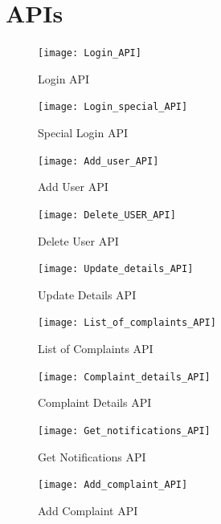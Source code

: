 \documentclass{article}
\begin{document}
\section{APIs}
        \begin{figure}[h]
            \centering
            \texttt{[image: Login\_API]}
            \caption{Login API}
            \label{fig:my_label}
        \end{figure}
        \begin{figure}[h]
            \centering
            \texttt{[image: Login\_special\_API]}
            \caption{Special Login API}
            \label{fig:my_label}
        \end{figure}
        \begin{figure}[h]
            \centering
            \texttt{[image: Add\_user\_API]}
            \caption{Add User API}
            \label{fig:my_label}
        \end{figure}
        \begin{figure}[h]
            \centering
            \texttt{[image: Delete\_USER\_API]}
            \caption{Delete User API}
            \label{fig:my_label}
        \end{figure}
        \begin{figure}[h]
            \centering
            \texttt{[image: Update\_details\_API]}
            \caption{Update Details API}
            \label{fig:my_label}
        \end{figure}
        \begin{figure}[h]
            \centering
            \texttt{[image: List\_of\_complaints\_API]}
            \caption{List of Complaints API}
            \label{fig:my_label}
        \end{figure}
        \begin{figure}[h]
            \centering
            \texttt{[image: Complaint\_details\_API]}
            \caption{Complaint Details API}
            \label{fig:my_label}
        \end{figure}
        \begin{figure}[h]
            \centering
            \texttt{[image: Get\_notifications\_API]}
            \caption{Get Notifications API}
            \label{fig:my_label}
        \end{figure}
        \begin{figure}[h]
            \centering
            \texttt{[image: Add\_complaint\_API]}
            \caption{Add Complaint API}
            \label{fig:my_label}
        \end{figure}
\end{document}
